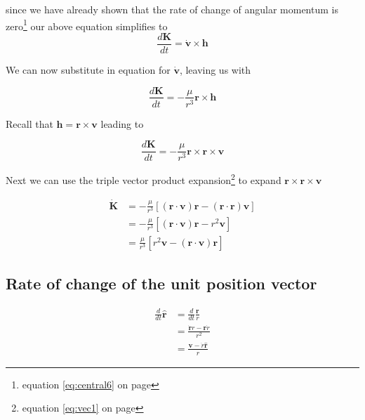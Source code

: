 since we have already shown that the rate of change of angular momentum is zero\footnote{equation \ref{eq:central6} on page \pageref{eq:central6}}
our above equation simplifies to
\begin{equation}
\frac{d\mathbf{K}}{dt} = \dot{\mathbf{v}} \times \mathbf{h}
\end{equation}

We can now substitute in equation  for $\dot{\mathbf{v}}$, leaving us with

\begin{equation}
\frac{d\mathbf{K}}{dt} = -\frac{\mu}{r^3} \mathbf{r} \times \mathbf{h}
\end{equation}

Recall that $\mathbf{h} = \mathbf{r} \times \mathbf{v}$ leading to

\begin{equation}
\frac{d\mathbf{K}}{dt} = -\frac{\mu}{r^3} \mathbf{r} \times \mathbf{r} \times \mathbf{v}
\end{equation}

Next we can use the triple vector product expansion\footnote{equation \ref{eq:vec1} on page \pageref{eq:vec1}}
to expand $\mathbf{r} \times \mathbf{r} \times \mathbf{v}$

\begin{align}
\dot{\mathbf{K}} &= -\frac{\mu}{r^3} \left[ (\mathbf{r} \cdot \mathbf{v}) \mathbf{r}-(\mathbf{r} \cdot \mathbf{r})\mathbf{v} \right] \nonumber \\
&= -\frac{\mu}{r^3} \left[ (\mathbf{r} \cdot \mathbf{v}) \mathbf{r}-r^2 \mathbf{v} \right] \nonumber \\
&= \frac{\mu}{r^3} \left[ r^2 \mathbf{v} - (\mathbf{r} \cdot \mathbf{v}) \mathbf{r} \right] \label{eq:gravity4}
\end{align}

\subsection{Rate of change of the unit position vector}

\begin{align}
\frac{d}{dt}\hat{\mathbf{r}} & = \frac{d}{dt}\frac{\mathbf{r}}{r}\nonumber \\
&=\frac {\dot{\mathbf{r}}r-\mathbf{r}\dot{r}}{r^2} \nonumber \\
&=\frac {{\mathbf{v}}-\dot{r}\hat{\mathbf{r}}}{r} \label{eq:gravity3}
\end{align}

